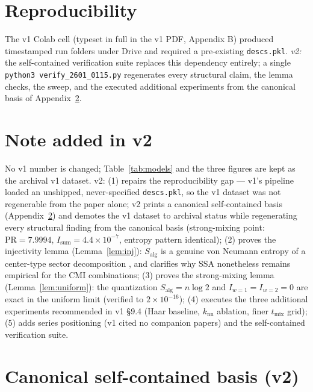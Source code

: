 \documentclass[11pt]{article}
\theoremstyle{remark}
\newcommand{\Salg}{S_{\mathrm{alg}}}
\begin{document}
\section{Reproducibility}

The v1 Colab cell (typeset in full in the v1 PDF, Appendix B) produced
timestamped run folders under Drive and required a pre-existing
\texttt{descs.pkl}. \emph{v2:} the self-contained verification suite
replaces this dependency entirely; a single \texttt{python3
verify\_2601\_0115.py} regenerates every structural claim, the lemma
checks, the sweep, and the executed additional experiments from the
canonical basis of Appendix~\ref{app:canonical}.

\section*{Note added in v2}
No v1 number is changed; Table~\ref{tab:models} and the three figures
are kept as the archival v1 dataset. v2: (1) repairs the reproducibility
gap --- v1's pipeline loaded an unshipped, never-specified
\texttt{descs.pkl}, so the v1 dataset was not regenerable from the paper
alone; v2 prints a canonical self-contained basis
(Appendix~\ref{app:canonical}) and demotes the v1 dataset to archival
status while regenerating every structural finding from the canonical
basis (strong-mixing point: $\mathrm{PR} = 7.9994$, $I_{\mathrm{sum}} =
4.4\times10^{-7}$, entropy pattern identical); (2) proves the
injectivity lemma (Lemma~\ref{lem:inj}): $\Salg$ is a genuine von
Neumann entropy of a center-type sector decomposition \cite{CHR}, and
clarifies why SSA nonetheless remains empirical for the CMI
combinations; (3) proves the strong-mixing lemma
(Lemma~\ref{lem:uniform}): the quantization $\Salg = n\log2$ and
$I_{w=1} = I_{w=2} = 0$ are exact in the uniform limit (verified to
$2\times10^{-16}$); (4) executes the three additional experiments
recommended in v1 \S9.4 (Haar baseline, $k_{\mathrm{nn}}$ ablation,
finer $t_{\mathrm{mix}}$ grid); (5) adds series positioning (v1 cited no
companion papers) and the self-contained verification suite.

\appendix

\section{Canonical self-contained basis (v2)}
\label{app:canonical}
\end{document}
